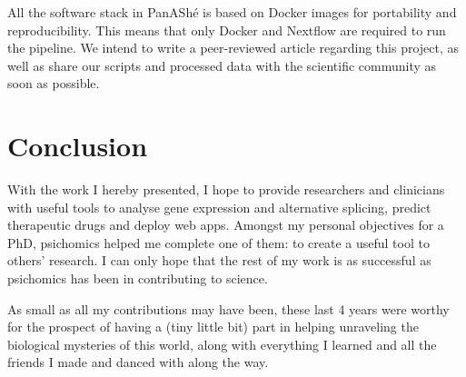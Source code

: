 All the software stack in PanAShé is based on Docker images for portability and reproducibility. This means that only Docker and Nextflow are required to run the pipeline. We intend to write a peer-reviewed article regarding this project, as well as share our scripts and processed data with the scientific community as soon as possible.

\section{Conclusion}

With the work I hereby presented, I hope to provide researchers and clinicians with useful tools to analyse gene expression and alternative splicing, predict therapeutic drugs and deploy web apps. Amongst my personal objectives for a PhD, psichomics helped me complete one of them: to create a useful tool to others' research. I can only hope that the rest of my work is as successful as psichomics has been in contributing to science.

As small as all my contributions may have been, these last 4 years were worthy for the prospect of having a (tiny little bit) part in helping unraveling the biological mysteries of this world, along with everything I learned and all the friends I made and danced with along the way.

